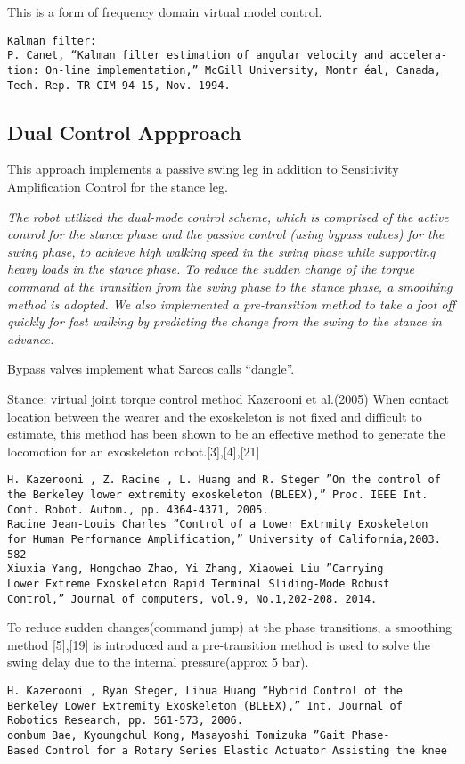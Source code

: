 \documentclass[letterpaper,12pt,fullpage]{article}
\begin{document}
This is a form of frequency domain virtual model control.

\begin{verbatim}
Kalman filter:
P. Canet, “Kalman filter estimation of angular velocity and accelera-
tion: On-line implementation,” McGill University, Montr ́eal, Canada,
Tech. Rep. TR-CIM-94-15, Nov. 1994.
\end{verbatim}

\subsection{Dual Control Appproach}

This approach implements a passive swing leg in addition to Sensitivity 
Amplification Control for the stance leg.

{\it The robot utilized the dual-mode control scheme, which is
comprised of the active control for the stance phase and the
passive control (using bypass valves) for the swing phase, to achieve high walking
speed in the swing phase while supporting heavy loads in
the stance phase. To reduce the sudden change of the torque
command at the transition from the swing phase to the stance
phase, a smoothing method is adopted. We also implemented
a pre-transition method to take a foot off quickly for fast
walking by predicting the change from the swing to the stance
in advance.}~\cite{IEEE07222598}

Bypass valves implement what Sarcos calls ``dangle''.

Stance: virtual joint torque control method Kazerooni et al.(2005)
When contact location between the wearer and the
exoskeleton is not fixed and difficult to estimate, this method
has been shown to be an effective method to generate the
locomotion for an exoskeleton robot.[3],[4],[21]
\begin{verbatim}
H. Kazerooni , Z. Racine , L. Huang and R. Steger ”On the control of
the Berkeley lower extremity exoskeleton (BLEEX),” Proc. IEEE Int.
Conf. Robot. Autom., pp. 4364-4371, 2005.
Racine Jean-Louis Charles ”Control of a Lower Extrmity Exoskeleton
for Human Performance Amplification,” University of California,2003.
582
Xiuxia Yang, Hongchao Zhao, Yi Zhang, Xiaowei Liu ”Carrying
Lower Extreme Exoskeleton Rapid Terminal Sliding-Mode Robust
Control,” Journal of computers, vol.9, No.1,202-208. 2014.
\end{verbatim}

To reduce
sudden changes(command jump) at the phase transitions, a
smoothing method [5],[19] is introduced and a pre-transition
method is used to solve the swing delay due to the internal
pressure(approx 5 bar).
\begin{verbatim}
H. Kazerooni , Ryan Steger, Lihua Huang ”Hybrid Control of the
Berkeley Lower Extremity Exoskeleton (BLEEX),” Int. Journal of
Robotics Research, pp. 561-573, 2006.
oonbum Bae, Kyoungchul Kong, Masayoshi Tomizuka ”Gait Phase-
Based Control for a Rotary Series Elastic Actuator Assisting the knee
\end{verbatim}
\end{document}
